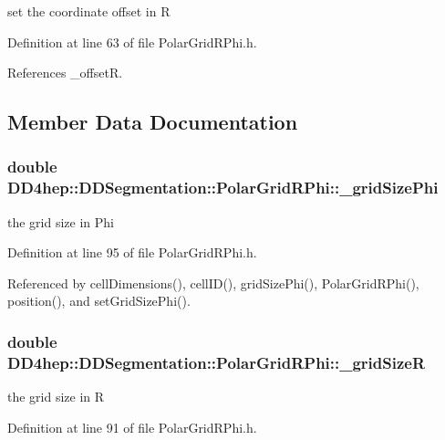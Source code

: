 set the coordinate offset in R 

Definition at line 63 of file PolarGridRPhi.h.

References \_\-offsetR.

\subsection{Member Data Documentation}
\hypertarget{class_d_d4hep_1_1_d_d_segmentation_1_1_polar_grid_r_phi_abf48a7497f4d676d89b36371e4cf0af7}{
\subsubsection[{\_\-gridSizePhi}]{\setlength{\rightskip}{0pt plus 5cm}double {\bf DD4hep::DDSegmentation::PolarGridRPhi::\_\-gridSizePhi}}}
\label{class_d_d4hep_1_1_d_d_segmentation_1_1_polar_grid_r_phi_abf48a7497f4d676d89b36371e4cf0af7}


the grid size in Phi 

Definition at line 95 of file PolarGridRPhi.h.

Referenced by cellDimensions(), cellID(), gridSizePhi(), PolarGridRPhi(), position(), and setGridSizePhi().\hypertarget{class_d_d4hep_1_1_d_d_segmentation_1_1_polar_grid_r_phi_a3f8b1d0889b592d5f6b08a27ef376c18}{
\subsubsection[{\_\-gridSizeR}]{\setlength{\rightskip}{0pt plus 5cm}double {\bf DD4hep::DDSegmentation::PolarGridRPhi::\_\-gridSizeR}}}
\label{class_d_d4hep_1_1_d_d_segmentation_1_1_polar_grid_r_phi_a3f8b1d0889b592d5f6b08a27ef376c18}


the grid size in R 

Definition at line 91 of file PolarGridRPhi.h.

